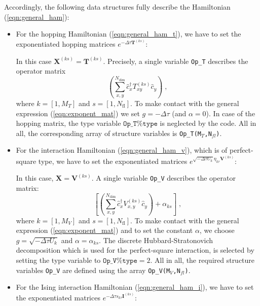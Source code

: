 \documentclass{SciPost}
\begin{document}
Accordingly, the following data structures fully describe the  Hamiltonian (\ref{eqn:general_ham}):
\begin{itemize}
\item For the hopping Hamiltonian (\ref{eqn:general_ham_t}), we have to set the exponentiated hopping matrices $ e^{-\Delta \tau {\bm T}^{(ks)}}$: 

In this case $\mathbf{X}^{(ks)}=\mathbf{T}^{(ks)}$. Precisely, a single variable  \texttt{Op\_T}  describes the operator matrix
\begin{equation}
            \left( \sum_{x,y}^{N_{\mathrm{dim}}} \hat{c}^{\dagger}_x T_{xy}^{(ks)} \hat{c}^{\phantom{\dagger}}_{y}  \right)  \;,
\end{equation} 
where $k=[1, M_{T}]$ and $s=[1, N_{\mathrm{fl}}]$.  
To make contact with the general expression (\ref{eqn:exponent_mat}) we set $g=-\Delta \tau$ (and $\alpha = 0$).
In case of the hopping matrix, the type variable $\texttt{Op\_T\%type}$  is neglected by the code. 
All in all, the corresponding array of structure variables is  \texttt{Op\_T(M$_T$,N$_{fl}$)}.

\item For the interaction Hamiltonian (\ref{eqn:general_ham_v}), which is of perfect-square type, we have to set the exponentiated matrices $e^{  \sqrt{ -  \Delta \tau  U_k} \eta_{k\tau} {\bm V}^{(ks)} }$:

In this case, ${\mathbf X}  = \mathbf{V}^{(ks)}$. A single variable  \texttt{Op\_V}  describes the operator matrix:
\begin{equation}
             \left[ \left( \sum_{x,y}^{N_{\mathrm{dim}}} \hat{c}^{\dagger}_x V_{x,y}^{(ks)} \hat{c}^{\phantom{\dagger}}_{y}  \right)  + \alpha_{ks} \right]  \;,
\end{equation} 
where $k=[1, M_{V}]$ and $s=[1, N_{\mathrm{fl}}]$. 
To make contact with the general expression (\ref{eqn:exponent_mat}) and to set the constant $\alpha$, we choose $g = \sqrt{-\Delta \tau  U_k}$ and  $\alpha = \alpha_{ks}$. 
The discrete Hubbard-Stratonovich decomposition which is used for the perfect-square interaction, is selected by setting the type variable to $\texttt{Op\_V\%type}=2$.
All in all, the required structure variables \texttt{Op\_V} are defined  using the array \texttt{Op\_V(M$_V$,N$_{fl}$)}.


\item For the Ising interaction Hamiltonian (\ref{eqn:general_ham_i}), we have to set the exponentiated matrices $e^{  -\Delta \tau s_{k\tau}  {\bm I}^{(ks)}}$:


\end{itemize}
\end{document}
